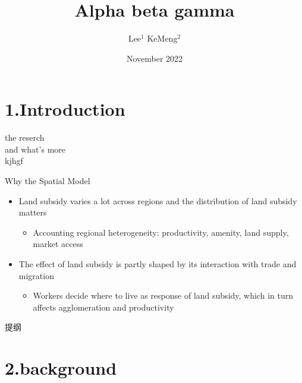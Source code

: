 \documentclass[compress]{beamer}
\title{Alpha beta gamma}
\author[] {Lee$^1$ \quad \quad KeMeng$^2$ \quad \quad }
\institute{$^1$Tsinghua University \quad $^2$UIBE}
\date{November 2022}
\begin{document}
	
	\maketitle
	
	
	
	
	
	
	
	\section{1.Introduction}
	\begin{frame}
		 the reserch \\
		 and what's more \\
		 kjhgf
	\end{frame} 
	
	\begin{frame}{Why the Spatial Model}
		\begin{itemize} \setlength{\itemsep}{15pt}
			\item Land subsidy varies a lot across regions and the distribution of land subsidy matters
			\begin{itemize} \setlength{\itemsep}{10pt}
				\item Accounting regional heterogeneity: productivity, amenity, land supply, market access
			\end{itemize}
			\item The effect of land subsidy is partly shaped by its interaction with trade and migration
			\begin{itemize} \setlength{\itemsep}{10pt}
				\item Workers decide where to live as response of land subsidy, which in turn affects agglomeration and productivity
			\end{itemize}
		\end{itemize}
	\end{frame}
	
	
	\begin{frame}{提纲}
		\tableofcontents
	\end{frame}
	
	
	
	\section{2.background}
	
\end{document}
